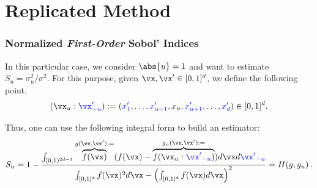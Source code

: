 \documentclass[11pt,compress]{beamer} %
\DeclareMathOperator{\Var}{Var}
\begin{document}
\section{Replicated Method}

\begin{frame}
\frametitle{Normalized \emph{First-Order} Sobol' Indices}
In this particular case, we consider $\abs{u}=1$ and want to estimate $S_{u}=\sigma_u^2/\sigma^2$. For this purpose, given $\vx,\vx'\in [0,1]^d$, we define the following point,
\begin{gather*}
(\vx_u:{\color{blue}\vx'_{-u}}) := ({\color{blue}x'_1},\dots,{\color{blue}x'_{u-1}},x_u,{\color{blue}x'_{u+1}},\dots,{\color{blue}x'_d})\in [0,1]^d.
\end{gather*}

Thus, one can use the following integral form to build an estimator:
\begin{equation*}
S_{u}=1-\frac{\int_{[0,1)^{2d-1}}\overbrace{f(\vx)}^{g(\vx,\vx'):=}(f(\vx) - \overbrace{f(\vx_u:{\color{blue}{\vx'}_{-u}})}^{g_u(\vx,\vx'):=}) d\vx d{\color{blue}{\vx'}_{-u}}}{\int_{[0,1]^d} f(\vx)^2 d{\vx}-\left(\int_{[0,1]^d} f(\vx) d{\vx}\right)^2}=H(g,g_u)\, .
\end{equation*}
\end{frame}

\end{document}
